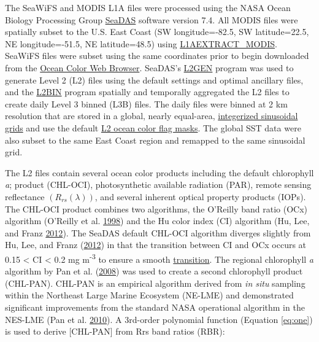 \documentclass[
]{book}
\begin{document}
The SeaWiFS and MODIS L1A files were processed using the NASA Ocean Biology Processing Group \href{https://seadas.gsfc.nasa.gov/}{SeaDAS} software version 7.4. All MODIS files were spatially subset to the U.S. East Coast (SW longitude=-82.5, SW latitude=22.5, NE longitude=-51.5, NE latitude=48.5) using \href{https://seadas.gsfc.nasa.gov/help/seadas-processing/ProcessL1aextract_modis.html}{L1AEXTRACT\_MODIS}. SeaWiFS files were subset using the same coordinates prior to begin downloaded from the \href{https://oceancolor.gsfc.nasa.gov/cgi/browse.pl?sen=am}{Ocean Color Web Browser}. SeaDAS's \href{https://seadas.gsfc.nasa.gov/help/seadas-processing/ProcessL2gen.html}{L2GEN} program was used to generate Level 2 (L2) files using the default settings and optimal ancillary files, and the \href{https://seadas.gsfc.nasa.gov/help/seadas-processing/ProcessL2bin.html}{L2BIN} program spatially and temporally aggregated the L2 files to create daily Level 3 binned (L3B) files. The daily files were binned at 2 km resolution that are stored in a global, nearly equal-area, \href{https://oceancolor.gsfc.nasa.gov/docs/format/l3bins/}{integerized sinusoidal grids} and use the default \href{https://oceancolor.gsfc.nasa.gov/atbd/ocl2flags/}{L2 ocean color flag masks}. The global SST data were also subset to the same East Coast region and remapped to the same sinusoidal grid.

The L2 files contain several ocean color products including the default chlorophyll \emph{a}; product (CHL-OCI), photosynthetic available radiation (PAR), remote sensing reflectance \((R_{rs}(\lambda))\), and several inherent optical property products (IOPs). The CHL-OCI product combines two algorithms, the O'Reilly band ratio (OCx) algorithm (O'Reilly et al. \protect\hyperlink{ref-SOE11}{1998}) and the Hu color index (CI) algorithm (Hu, Lee, and Franz \protect\hyperlink{ref-SOE5}{2012}). The SeaDAS default CHL-OCI algorithm diverges slightly from Hu, Lee, and Franz (\protect\hyperlink{ref-SOE5}{2012}) in that the transition between CI and OCx occurs at 0.15 \textless{} CI \textless{} 0.2 mg m\textsuperscript{-3} to ensure a smooth \href{https://oceancolor.gsfc.nasa.gov/atbd/chlor_a/}{transition}. The regional chlorophyll \emph{a} algorithm by Pan et al. (\protect\hyperlink{ref-SOE12}{2008}) was used to create a second chlorophyll product (CHL-PAN). CHL-PAN is an empirical algorithm derived from \emph{in situ} sampling within the Northeast Large Marine Ecosystem (NE-LME) and demonstrated significant improvements from the standard NASA operational algorithm in the NES-LME (Pan et al. \protect\hyperlink{ref-SOE13}{2010}). A 3rd-order polynomial function (Equation \eqref{eq:one}) is used to derive {[}CHL-PAN{]} from Rrs band ratios (RBR):
\end{document}
